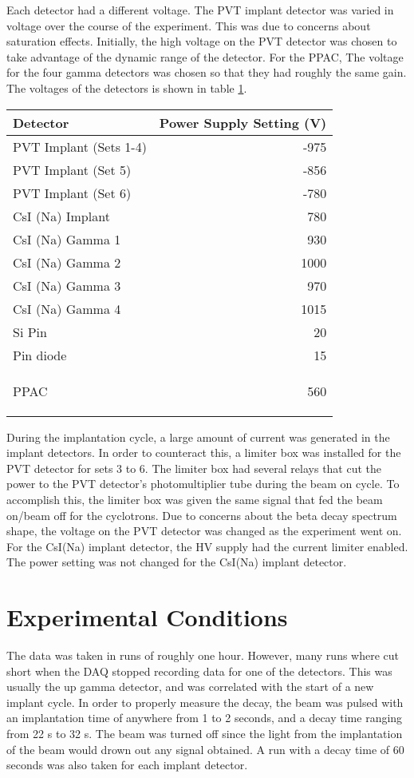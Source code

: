 Each detector had a different voltage. 
The PVT implant detector was varied in voltage over the course of the experiment.
This was due to concerns about saturation effects.
Initially, the high voltage on the PVT detector was chosen to take advantage of the dynamic range of the detector.
For the PPAC, 
The voltage for the four gamma detectors was chosen so that they had roughly the same gain.
The voltages of the detectors is shown in table \ref{tab:detvolt}.
\begin{table}[!hbt]
	\centering
		\begin{tabular}{l|r}
		Detector & Power Supply Setting (V) \\ \hline
		PVT Implant (Sets 1-4) & -975 \\
		PVT Implant (Set 5) & -856 \\
		PVT Implant (Set 6) & -780 \\
		CsI (Na) Implant & 780 \\ 
		CsI (Na) Gamma 1 & 930 \\
		CsI (Na) Gamma 2 & 1000 \\
		CsI (Na) Gamma 3 & 970 \\
		CsI (Na) Gamma 4 & 1015 \\
		Si Pin & 20 \\
		Pin diode & 15 \\
		PPAC & 560  
		
		\label{tab:detvolt}
		\end{tabular}
\end{table}

During the implantation cycle, a large amount of current was generated in the implant detectors.
In order to counteract this, a limiter box was installed for the PVT detector for sets 3 to 6.
The limiter box had several relays that cut the power to the PVT detector's photomultiplier tube during the beam on cycle. 
To accomplish this, the limiter box was given the same signal that fed the beam on/beam off for the cyclotrons.
Due to concerns about the beta decay spectrum shape, the voltage on the PVT detector was changed as the experiment went on. 
For the CsI(Na) implant detector, the HV supply had the current limiter enabled.
The power setting was not changed for the CsI(Na) implant detector. 


\section{Experimental Conditions}
The data was taken in runs of roughly one hour. 
However, many runs where cut short when the DAQ stopped recording data for one of the detectors.
This was usually the up gamma detector, and was correlated with the start of a new implant cycle.
In order to properly measure the decay, the beam was pulsed with an implantation time of anywhere from 1 to 2 seconds, and a decay time ranging from 22 s to 32 s. 
The beam was turned off since the light from the implantation of the beam would drown out any signal obtained. 
A run with a decay time of 60 seconds was also taken for each implant detector. 

